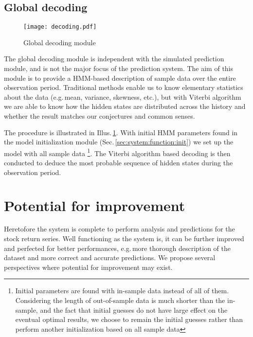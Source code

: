 \subsection{Global decoding}
\label{sec:system:function:decoding}

		\begin{figure}[!hbt]
        \center
        \texttt{[image: decoding.pdf]}
        \caption{Global decoding module}
        \label{fig:system:decoding}
        \end{figure}
The global decoding module is independent with the simulated prediction module,
and is not the major focus of the prediction system.
The aim of this module is to provide a HMM-based description of 
sample data over the entire observation period.
Traditional methods enable us to know elementary statistics about the data 
(e.g.\,mean, variance, skewness, etc.),
but with Viterbi algorithm we are able to know 
how the hidden states are distributed across the history and 
whether the result matches our conjectures and common senses.

The procedure is illustrated in Illus.\,\ref{fig:system:decoding}.
With initial HMM parameters found in the model initialization module 
(Sec.\,\ref{sec:system:function:init})
we set up the model with all sample data
\footnote{Initial parameters are found with in-sample data instead of all of them. 
Considering the length of out-of-sample data is much shorter than the in-sample,
and the fact that initial guesses do not have large effect on the eventual optimal results,
we choose to remain the initial guesses rather than 
perform another initialization based on all sample data}.
The Viterbi algorithm based decoding is then conducted to 
deduce the most probable sequence of hidden states during the observation period.


\section{Potential for improvement}
\label{sec:system:improvement}
Heretofore the system is complete to perform analysis and predictions 
for the stock return series.
Well functioning as the system is,
it can be further improved and perfected for better performances,
e.g.\,more thorough description of the dataset and more correct and accurate predictions.
We propose several perspectives where potential for improvement may exist.

